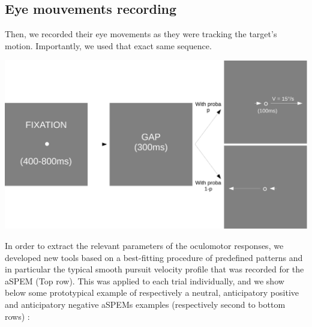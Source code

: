 \documentclass[profile,final,english, draft]{article}%
\begin{document}
\subsection*{Eye mouvements recording}
Then, we recorded their eye movements as they were tracking the target's motion. Importantly, we used that exact same sequence.
\begin{center} 
    \includegraphics[width=1\linewidth]{materiel_recording}
\end{center}







In order to extract the relevant parameters of the oculomotor responses, we developed new tools based on a best-fitting procedure of predefined patterns and in particular the typical smooth pursuit velocity profile that was recorded for the aSPEM (Top row). This was applied to each trial individually, and we show below some prototypical example of respectively a neutral, anticipatory positive and anticipatory negative aSPEMs examples (respectively second to bottom rows) :
\end{document}
